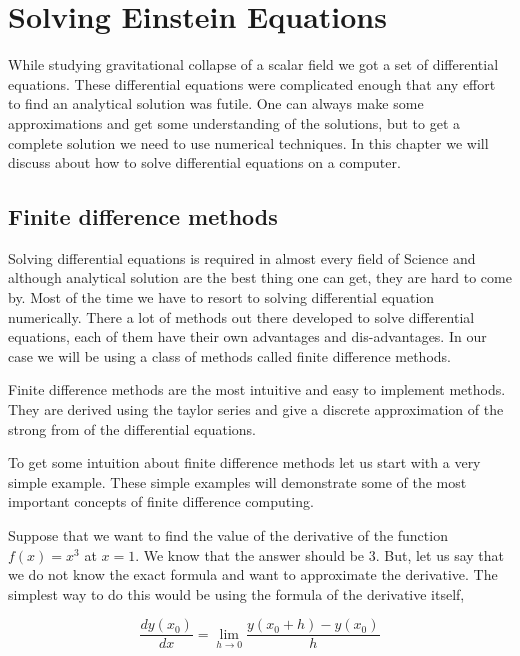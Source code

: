 \chapter{Solving Einstein Equations}

While studying gravitational collapse of a scalar field we got a set of differential equations. These differential equations were complicated enough that any effort to find an analytical solution was futile. One can always make some approximations and get some understanding of the solutions, but to get a complete solution we need to use numerical techniques. In this chapter we will discuss about how to solve differential equations on a computer.




\section{Finite difference methods}

Solving differential equations is required in almost every field of Science and although analytical solution are the best thing one can get, they are hard to come by.
Most of the time we have to resort to solving differential equation numerically. There a lot of methods out there developed to solve differential equations, each of them have their own advantages and dis-advantages. In our case we will be using a class of methods called finite difference methods.

 Finite difference methods are the most intuitive and easy to implement methods. They are derived using the taylor series and give a discrete approximation of the strong from of the differential equations.

To get some intuition about finite difference methods let us start with a very simple example. These simple examples will demonstrate some of the most important concepts of finite difference computing.

Suppose that we want to find the value of the derivative of the function $f(x) = x^3$ at $x =1$. We know that the answer should be $3$. But, let us say that we do not know the exact formula and want to approximate the derivative.
The simplest way to do this would be using the formula of the derivative itself,

\begin{equation}
    \frac{dy(x_0)}{dx} = \lim_{h \to 0}\frac{y(x_0 + h) - y(x_0)}{h}
\end{equation}

